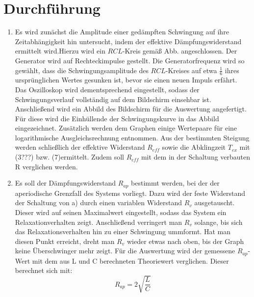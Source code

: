 \section{Durchführung}
\label{sec:Durchführung}
\renewcommand{\labelenumi}{\alph{enumi})}
\begin{enumerate}
\item Es wird zunächst die Amplitude einer gedämpften Schwingung auf ihre Zeitabhängigkeit hin untersucht, indem
 der effektive Dämpfungswiderstand ermittelt wird.Hierzu wird ein $RCL$-Kreis gemäß
 Abb.  angeschlossen. Der Generator wird auf Rechteckimpulse gestellt.
  Die Generatorfrequenz wird so gewählt, dass die Schwingungsamplitude des $RCL$-Kreises auf etwa $\frac{1}{6}$
   ihres ursprünglichen Wertes gesunken ist, bevor sie einen neuen Impuls erfährt. Das Oszilloskop
    wird dementsprechend eingestellt, sodass der Schwingungsverlauf vollständig auf dem Bildschirm einsehbar ist.
    Anschließend wird ein Abbild des Bildschirm für die Auswertung angefertigt.
    Für diese wird die Einhüllende der Schwingungskurve in das Abbild eingezeichnet.
     Zusätzlich werden dem Graphen einige Wertepaare für eine logarithmische Ausgleichsrechnung entnommen.
      Aus der bestimmten Steigung werden schließlich der effektive Widerstand $R_{eff}$ sowie die Abklingzeit $T_{ex}$  mit (3???) bzw. (7)ermittelt.
       Zudem soll $R_{eff}$ mit dem in der Schaltung verbauten R verglichen werden.

     \item Es soll der Dämpfungswiderstand $R_{ap}$ bestimmt werden, bei der der aperiodische Grenzfall des Systems vorliegt.
     Dazu wird der feste Widerstand der Schaltung von a) durch einen variablen Widerstand $R_v$
     ausgetauscht. Dieser wird auf seinen Maximalwert eingestellt, sodass das System ein Relaxationverhalten zeigt.
      Anschließend verringert man $R_v$ solange, bis sich das Relaxationsverhalten hin zu einer Schwingung ummformt.
      Hat man diesen Punkt erreicht, dreht man $R_v$ wieder etwas nach oben, bis der Graph keine Überschwinger mehr zeigt.
      Für die Auswertung wird der gemessene $R_{ap}$-Wert mit dem aus L und C berechneten Theoriewert verglichen.
       Dieser berechnet sich mit:
       \begin{equation}
         R_{ap} = 2\sqrt{\frac{L}{C}}
       \end{equation}


\end{enumerate}
